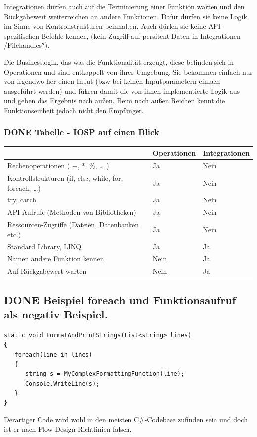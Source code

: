 \documentclass[11pt]{article}
\begin{document}
\begin{enumerate}
Integrationen dürfen auch auf die Terminierung einer Funktion warten und den Rückgabewert  weiterreichen an andere Funktionen.
Dafür dürfen sie keine Logik im Sinne von Kontrollstrukturen beinhalten.
Auch dürfen sie keine API-spezifischen Befehle kennen, (kein Zugriff auf
persitent Daten in Integrationen /Filehandles?).

Die Businesslogik, das was die Funktionalität erzeugt, diese befinden sich in Operationen und sind entkoppelt von ihrer Umgebung.
Sie bekommen einfach nur von irgendwo her einen Input (bzw bei keinen Inputparametern einfach ausgeführt werden) und führen damit die von ihnen implementierte
Logik aus und geben das Ergebnis nach außen. Beim nach außen Reichen kennt die Funktionseinheit jedoch nicht den Empfänger.
\end{enumerate}

\subsubsection{{\bfseries\sffamily DONE} Tabelle -  IOSP auf einen Blick}
\label{sec:orgheadline23}
\begin{center}
\begin{tabular}{lll}
 & Operationen & Integrationen\\
\hline
Rechenoperationen ( +, *, \%, \ldots{} ) & Ja & Nein\\
Kontrollstrukturen (if, else, while, for, foreach, \ldots{}) & Ja & Nein\\
try, catch & Ja & Nein\\
API-Aufrufe (Methoden von Bibliotheken) & Ja & Nein\\
Ressourcen-Zugriffe (Dateien, Datenbanken etc.) & Ja & Nein\\
Standard Library, LINQ & Ja & Ja\\
Namen andere Funktion kennen & Nein & Ja\\
Auf Rückgabewert warten & Nein & Ja\\
\end{tabular}
\end{center}



\subsection{{\bfseries\sffamily DONE} Beispiel foreach und Funktionsaufruf als negativ Beispiel.}
\label{sec:orgheadline25}
\begin{verbatim}
static void FormatAndPrintStrings(List<string> lines)
{
   foreach(line in lines)
   {
      string s = MyComplexFormattingFunction(line);
      Console.WriteLine(s);
   }
}
\end{verbatim}
Derartiger Code wird wohl in den meisten C\#-Codebase zufinden sein und doch ist er nach Flow Design Richtlinien falsch.
\end{document}
